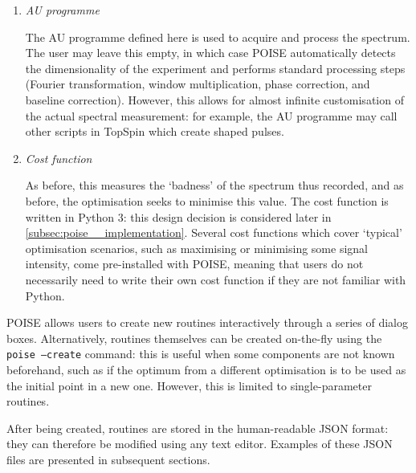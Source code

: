 \begin{enumerate}
    \item \textit{AU programme}

        The AU programme defined here is used to acquire and process the spectrum.
        The user may leave this empty, in which case POISE automatically detects the dimensionality of the experiment and performs standard processing steps (Fourier transformation, window multiplication, phase correction, and baseline correction).
        However, this allows for almost infinite customisation of the actual spectral measurement: for example, the AU programme may call other scripts in TopSpin which create shaped pulses.

    \item \textit{Cost function}

        As before, this measures the `badness' of the spectrum thus recorded, and as before, the optimisation seeks to minimise this value.
        The cost function is written in Python 3: this design decision is considered later in \cref{subsec:poise__implementation}.
        Several cost functions which cover `typical' optimisation scenarios, such as maximising or minimising some signal intensity, come pre-installed with POISE, meaning that users do not necessarily need to write their own cost function if they are not familiar with Python.
\end{enumerate}

POISE allows users to create new routines interactively through a series of dialog boxes.
Alternatively, routines themselves can be created on-the-fly using the \texttt{poise --create} command: this is useful when some components are not known beforehand, such as if the optimum from a different optimisation is to be used as the initial point in a new one.
However, this is limited to single-parameter routines.

After being created, routines are stored in the human-readable JSON format: they can therefore be modified using any text editor.
Examples of these JSON files are presented in subsequent sections.
